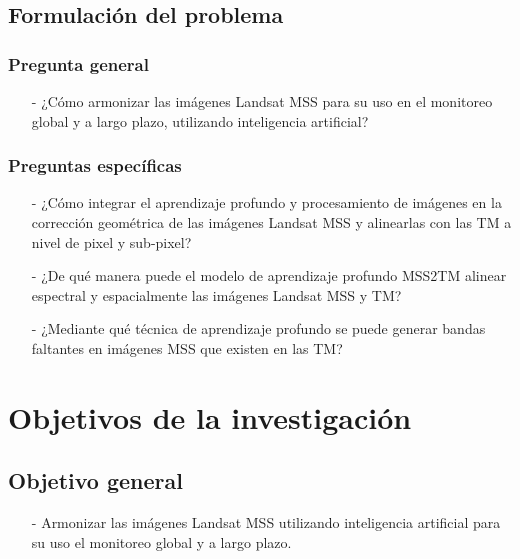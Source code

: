         \subsection{Formulación del problema}
            \subsubsection{Pregunta general}
            \begin{itemize}
                \item[-] ¿Cómo armonizar las imágenes Landsat MSS para su uso en el monitoreo global y a largo plazo, utilizando inteligencia artificial?
            \end{itemize}
            \subsubsection{Preguntas específicas}
                \begin{itemize}
                    \item[-] ¿Cómo integrar el aprendizaje profundo y procesamiento de imágenes en la corrección geométrica de las imágenes Landsat MSS y alinearlas con las TM a nivel de pixel y sub-pixel?
                    \item[-] ¿De qué manera puede el modelo de aprendizaje profundo MSS2TM alinear espectral y espacialmente las imágenes Landsat MSS y TM?
                    \item[-] ¿Mediante qué técnica de aprendizaje profundo se puede generar bandas faltantes en imágenes MSS que existen en las TM?
                \end{itemize}
    \section{Objetivos de la investigación}
        \subsection{Objetivo general}
            \begin{itemize}
                \item[-]Armonizar las imágenes Landsat MSS utilizando inteligencia artificial para su uso el monitoreo global y a largo plazo.
            \end{itemize}
